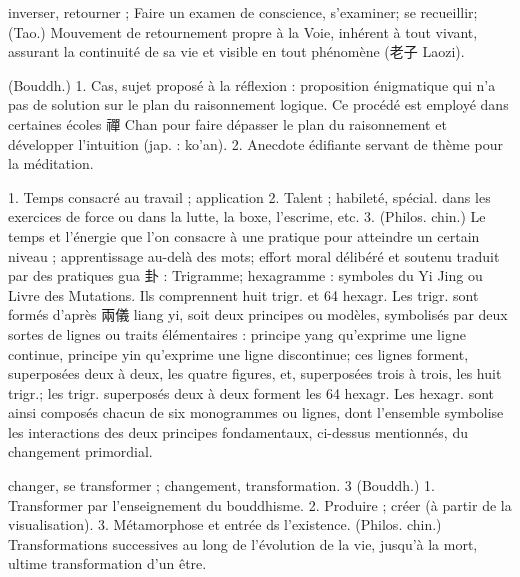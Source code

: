 \begin{Def}[fan 反]
    inverser, retourner ; Faire un examen de conscience, s’examiner; se recueillir; (Tao.) Mouvement de retournement propre à la Voie, inhérent à tout vivant, assurant la continuité de sa vie et visible en tout phénomène (老子 Laozi). 
\end{Def}
\begin{Def}[gong’an 公案]
    (Bouddh.) 1. Cas, sujet proposé à la réflexion : proposition énigmatique qui n’a pas de solution sur le plan du raisonnement logique. Ce procédé est employé dans certaines écoles 禪 Chan pour faire dépasser le plan du raisonnement et développer l’intuition (jap. : ko’an).  2. Anecdote édifiante servant de thème pour la méditation.
\end{Def}
\begin{Def}[gongfu 功夫]
     1. Temps consacré au travail ; application 2. Talent ; habileté, spécial. dans les exercices de force ou dans la lutte, la boxe, l’escrime, etc. 3. (Philos. chin.) Le temps et l’énergie que l’on consacre à une pratique pour atteindre un certain niveau ; apprentissage au-delà des mots; effort moral délibéré et soutenu traduit par des pratiques gua 卦 : Trigramme; hexagramme : symboles du Yi Jing ou Livre des Mutations. Ils comprennent huit trigr. et 64 hexagr. Les trigr. sont formés d’après 兩儀 liang yi, soit deux principes ou modèles, symbolisés par deux sortes de lignes ou traits élémentaires : principe yang qu’exprime une ligne continue, principe yin qu’exprime une ligne discontinue; ces lignes forment, superposées deux à deux, les quatre figures, et, superposées trois à trois, les  huit trigr.; les trigr. superposés deux à deux forment les 64 hexagr. Les hexagr. sont ainsi composés chacun de six monogrammes ou lignes, dont l’ensemble symbolise les interactions des deux principes fondamentaux, ci-dessus mentionnés, du changement primordial.		
\end{Def}

  \begin{Def}[hua 化]
    changer, se transformer ; changement, transformation.   3 (Bouddh.) 1. Transformer par l’enseignement du bouddhisme. 2. Produire ; créer (à partir de la visualisation). 3. Métamorphose et entrée ds l’existence. (Philos. chin.) Transformations successives au long de l’évolution de la vie, jusqu’à la mort, ultime transformation d’un être. 
\end{Def}


